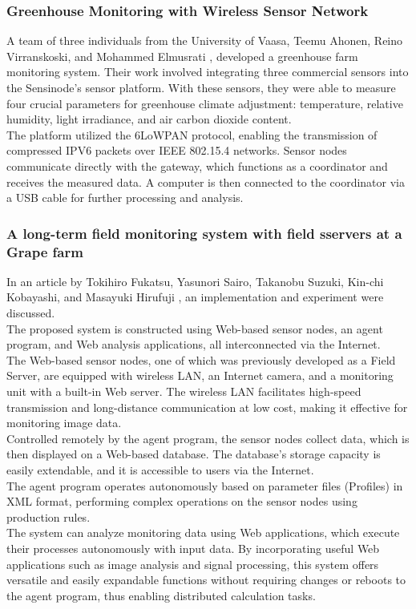 \documentclass[12pt, a4paper]{article}
\begin{document}
\subsubsection{Greenhouse Monitoring with Wireless Sensor Network}
A team of three individuals from the University of Vaasa, Teemu Ahonen, Reino Virranskoski, and Mohammed Elmusrati \cite{torabi2023greenhouse}, developed a greenhouse farm monitoring system. Their work involved integrating three commercial sensors into the Sensinode's sensor platform. With these sensors, they were able to measure four crucial parameters for greenhouse climate adjustment: temperature, relative humidity, light irradiance, and air carbon dioxide content.\\
The platform utilized the 6LoWPAN protocol, enabling the transmission of compressed IPV6 packets over IEEE 802.15.4 networks. Sensor nodes communicate directly with the gateway, which functions as a coordinator and receives the measured data. A computer is then connected to the coordinator via a USB cable for further processing and analysis.

\subsubsection{A long-term field monitoring system with field sservers at a Grape farm}
In an article by Tokihiro Fukatsu, Yasunori Sairo, Takanobu Suzuki, Kin-chi Kobayashi, and Masayuki Hirufuji \cite{saito2008long}, an implementation and experiment were discussed.\\
The proposed system is constructed using Web-based sensor nodes, an agent program, and Web analysis applications, all interconnected via the Internet.\\
The Web-based sensor nodes, one of which was previously developed as a Field Server, are equipped with wireless LAN, an Internet camera, and a monitoring unit with a built-in Web server. The wireless LAN facilitates high-speed transmission and long-distance communication at low cost, making it effective for monitoring image data.\\
Controlled remotely by the agent program, the sensor nodes collect data, which is then displayed on a Web-based database. The database's storage capacity is easily extendable, and it is accessible to users via the Internet.\\
The agent program operates autonomously based on parameter files (Profiles) in XML format, performing complex operations on the sensor nodes using production rules.\\
The system can analyze monitoring data using Web applications, which execute their processes autonomously with input data. By incorporating useful Web applications such as image analysis and signal processing, this system offers versatile and easily expandable functions without requiring changes or reboots to the agent program, thus enabling distributed calculation tasks.
\end{document}
